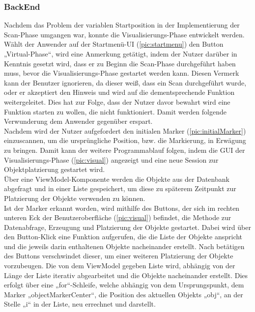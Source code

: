 \subsubsection{BackEnd}
Nachdem das Problem der variablen Startposition in der Implementierung der Scan-Phase umgangen war, konnte die Visualisierungs-Phase entwickelt werden. 
\\ 
\linebreak
Wählt der Anwender auf der Startmenü-\acs{UI} (\ref{pic:startmenu}) den Button „Virtual-Phase“, wird eine Anmerkung getätigt, indem der Nutzer darüber in 
Kenntnis gesetzt wird, dass er zu Beginn die Scan-Phase durchgeführt haben muss, bevor die Visualisierungs-Phase gestartet werden kann. Diesen Vermerk kann der 
Benutzer ignorieren, da dieser weiß, dass ein Scan durchgeführt wurde, oder er akzeptiert den Hinweis und wird auf die dementsprechende Funktion weitergeleitet. 
Dies hat zur Folge, dass der Nutzer davor bewahrt wird eine Funktion starten zu wollen, die nicht funktioniert. Damit werden folgende Verwunderung dem Anwender 
gegenüber erspart.
\\ 
Nachdem wird der Nutzer aufgefordert den initialen Marker (\ref{pic:initialMarker}) einzuscannen, um die ursprüngliche Position, bzw. die Markierung, in Erwägung 
zu bringen. Damit kann der weitere Programmablauf folgen, indem die \acs{GUI} der Visualisierungs-Phase (\ref{pic:visual}) angezeigt und eine neue Session zur 
Objektplatzierung gestartet wird. 
\\
Über eine ViewModel-Komponente werden die Objekte aus der Datenbank abgefragt und in einer Liste gespeichert, um diese zu späterem Zeitpunkt zur Platzierung der 
Objekte verwenden zu können. 
\\ 
Ist der Marker erkannt worden, wird mithilfe des Buttons, der sich im rechten unteren Eck der Benutzeroberfläche (\ref{pic:visual}) befindet, die Methode zur 
Datenabfrage, Erzeugung und Platzierung der Objekte gestartet. Dabei wird über den Button-Klick eine Funktion aufgerufen, die die Liste der Objekte anspricht und 
die jeweils darin enthaltenen Objekte nacheinander erstellt. Nach betätigen des Buttons verschwindet dieser, um einer weiteren Platzierung der Objekte 
vorzubeugen. Die von dem ViewModel gegeben Liste wird, abhängig von der Länge der Liste iterativ abgearbeitet und die Objekte nacheinander erstellt. Dies erfolgt 
über eine „for“-Schleife, welche abhängig von dem Ursprungspunkt, dem Marker „objectMarkerCenter“, die Position des aktuellen Objekts „obj“, an der Stelle „i“ 
in der Liste, neu errechnet und darstellt.
